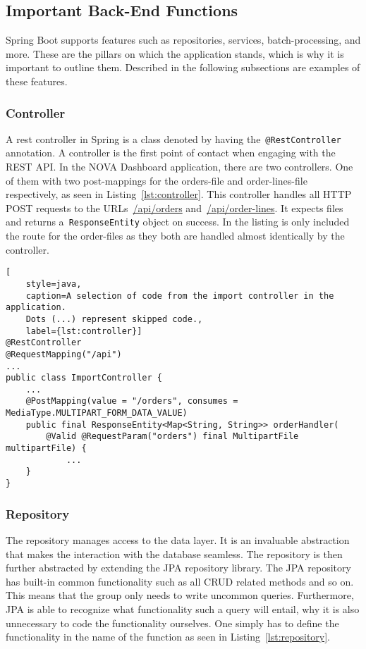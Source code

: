 \subsection{Important Back-End Functions}\label{subsec:important-back-end-functions}

Spring Boot supports features such as repositories, services, batch-processing, and more.
These are the pillars on which the application stands, which is why it is important to outline them.
Described in the following subsections are examples of these features.

\subsubsection{Controller}

A rest controller in Spring is a class denoted by having the~\texttt{@RestController} annotation.
A controller is the first point of contact when engaging with the REST API\@.
In the NOVA Dashboard application, there are two controllers.
One of them with two post-mappings for the orders-file and order-lines-file respectively, as seen in
Listing~\ref{lst:controller}.
This controller handles all HTTP POST requests to the URLs~\url{/api/orders} and~\url{/api/order-lines}.
It expects files and returns a~\texttt{ResponseEntity} object on success.
In the listing is only included the route for the order-files as they both are handled almost identically by the
controller.

\begin{lstlisting}[
    style=java,
    caption=A selection of code from the import controller in the application.
    Dots (...) represent skipped code.,
    label={lst:controller}]
@RestController
@RequestMapping("/api")
...
public class ImportController {
    ...
    @PostMapping(value = "/orders", consumes = MediaType.MULTIPART_FORM_DATA_VALUE)
    public final ResponseEntity<Map<String, String>> orderHandler(
        @Valid @RequestParam("orders") final MultipartFile multipartFile) {
            ...
    }
}
\end{lstlisting}

\subsubsection{Repository}

The repository manages access to the data layer.
It is an invaluable abstraction that makes the interaction with the database seamless.
The repository is then further abstracted by extending the JPA repository library.
The JPA repository has built-in common functionality such as all CRUD related methods and so on.
This means that the group only needs to write uncommon queries.
Furthermore, JPA is able to recognize what functionality such a query will entail,
why it is also unnecessary to code the functionality ourselves.
One simply has to define the functionality in the name of the function as seen in Listing~\ref{lst:repository}.

